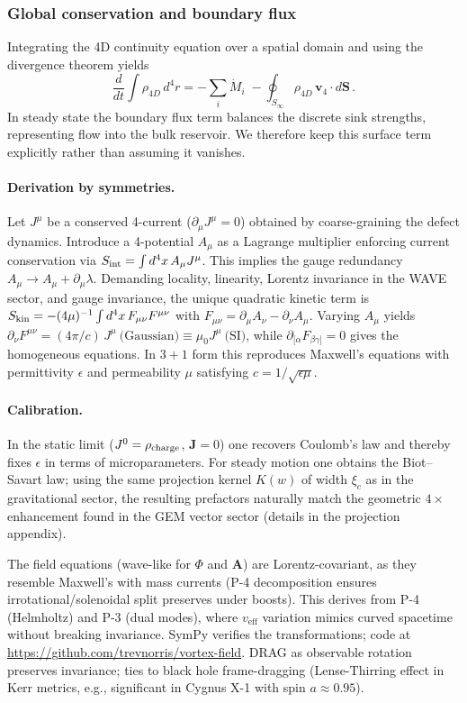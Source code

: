 \subsubsection{Global conservation and boundary flux}
Integrating the 4D continuity equation over a spatial domain and using the divergence theorem yields
\begin{equation}
\frac{d}{dt}\int \rho_{4D}\, d^4r = -\sum_i \dot M_i \;-
\oint_{S_\infty} \rho_{4D}\, \mathbf v_4\cdot d\mathbf S\,.
\end{equation}
In steady state the boundary flux term balances the discrete sink strengths, representing flow into the bulk reservoir. We therefore keep this surface term explicitly rather than assuming it vanishes.

\paragraph{Derivation by symmetries.} Let $J^\mu$ be a conserved 4-current ($\partial_\mu J^\mu=0$) obtained by coarse-graining the defect dynamics. Introduce a 4-potential $A_\mu$ as a Lagrange multiplier enforcing current conservation via $S_{\rm int}=\int d^4x\, A_\mu J^\mu$. This implies the gauge redundancy $A_\mu\to A_\mu+\partial_\mu\lambda$. Demanding locality, linearity, Lorentz invariance in the WAVE sector, and gauge invariance, the unique quadratic kinetic term is $S_{\rm kin}=-(4\mu)^{-1}\int d^4x\, F_{\mu\nu}F^{\mu\nu}$ with $F_{\mu\nu}=\partial_\mu A_\nu-\partial_\nu A_\mu$. Varying $A_\mu$ yields $\partial_\nu F^{\mu\nu} = (4\pi/c)\, J^\mu\ \text{(Gaussian)}\equiv \mu_0 J^\mu\ \text{(SI)}$, while $\partial_{[\alpha}F_{\beta\gamma]}=0$ gives the homogeneous equations. In $3{+}1$ form this reproduces Maxwell's equations with permittivity $\epsilon$ and permeability $\mu$ satisfying $c=1/\sqrt{\epsilon\mu}$.

\paragraph{Calibration.} In the static limit ($J^0=\rho_{\rm charge}$, $\mathbf J=0$) one recovers Coulomb's law and thereby fixes $\epsilon$ in terms of microparameters. For steady motion one obtains the Biot--Savart law; using the same projection kernel $K(w)$ of width $\xi_c$ as in the gravitational sector, the resulting prefactors naturally match the geometric $4\times$ enhancement found in the GEM vector sector (details in the projection appendix).


The field equations (wave-like for $\Phi$ and $\mathbf{A}$) are Lorentz-covariant, as they resemble Maxwell's with mass currents (P-4 decomposition ensures irrotational/solenoidal split preserves under boosts). This derives from P-4 (Helmholtz) and P-3 (dual modes), where $v_{\text{eff}}$ variation mimics curved spacetime without breaking invariance. SymPy verifies the transformations; code at \url{https://github.com/trevnorris/vortex-field}. DRAG as observable rotation preserves invariance; ties to black hole frame-dragging (Lense-Thirring effect in Kerr metrics, e.g., significant in Cygnus X-1 with spin $a \approx 0.95$).

